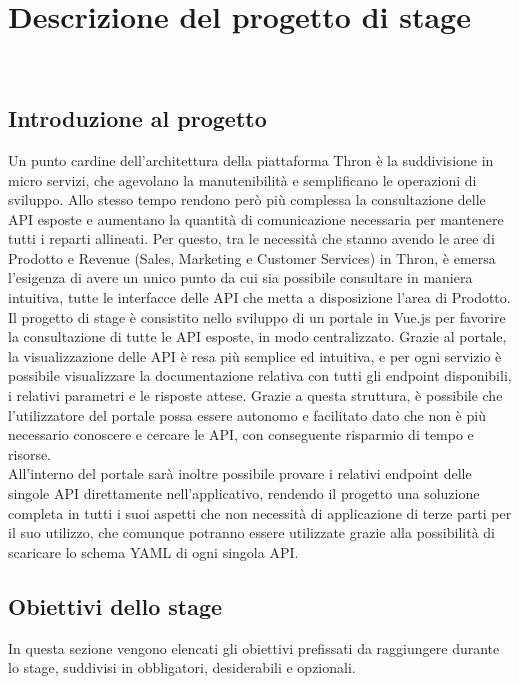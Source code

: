 \chapter{Descrizione del progetto di stage}
\label{cap:descrizione-stage}

\\

\section{Introduzione al progetto}
Un punto cardine dell'architettura della piattaforma Thron è la suddivisione in micro servizi, che agevolano la manutenibilità e semplificano le operazioni di sviluppo.
Allo stesso tempo rendono però più complessa la consultazione delle API esposte e aumentano la quantità di comunicazione necessaria per mantenere tutti i reparti allineati.
Per questo, tra le necessità che stanno avendo le aree di Prodotto e Revenue (Sales, Marketing e Customer Services) in Thron, è emersa l'esigenza di avere un unico punto
da cui sia possibile consultare in maniera intuitiva, tutte le interfacce delle API che metta a disposizione l'area di Prodotto.\\
Il progetto di stage è consistito nello sviluppo di un portale in Vue.js per favorire la consultazione di tutte le API esposte, in modo centralizzato.
Grazie al portale, la visualizzazione delle API è resa più semplice ed intuitiva, e per ogni servizio è possibile visualizzare la documentazione relativa 
con tutti gli endpoint disponibili, i relativi parametri e le risposte attese. Grazie a questa struttura, è possibile che l'utilizzatore del portale possa essere autonomo 
e facilitato dato che non è più necessario conoscere e cercare le API, con conseguente risparmio di tempo e risorse.\\
All'interno del portale sarà inoltre possibile provare i relativi endpoint delle singole API direttamente nell'applicativo, rendendo il progetto una soluzione completa
in tutti i suoi aspetti che non necessità di applicazione di terze parti per il suo utilizzo, che comunque potranno essere utilizzate grazie alla possibilità di scaricare
lo schema YAML di ogni singola API.


\section{Obiettivi dello stage}
In questa sezione vengono elencati gli obiettivi prefissati da raggiungere durante lo stage, suddivisi in obbligatori, desiderabili e opzionali.

